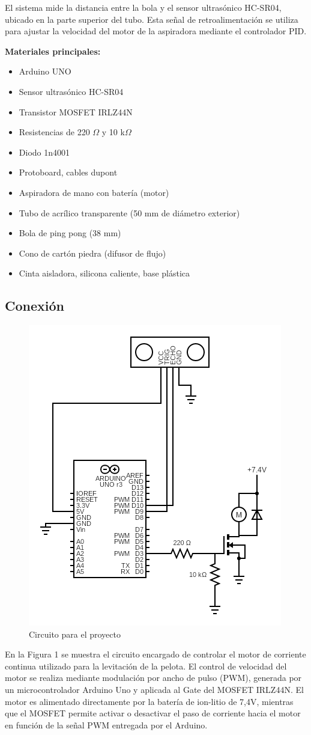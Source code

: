 \documentclass[12pt]{article}
\begin{document}
El sistema mide la distancia entre la bola y el sensor ultrasónico HC-SR04, ubicado en la parte superior del tubo. Esta señal de retroalimentación se utiliza para ajustar la velocidad del motor de la aspiradora mediante el controlador PID.

\textbf{Materiales principales:}
\begin{itemize}
\item Arduino UNO
\item Sensor ultrasónico HC-SR04
\item Transistor MOSFET IRLZ44N
\item Resistencias de 220 $\Omega$ y 10 k$\Omega$
\item Diodo 1n4001
\item Protoboard, cables dupont
\item Aspiradora de mano con batería (motor)
\item Tubo de acrílico transparente (50 mm de diámetro exterior)
\item Bola de ping pong (38 mm)
\item Cono de cartón piedra (difusor de flujo)
\item Cinta aisladora, silicona caliente, base plástica
\end{itemize}

\subsection{Conexión}

\begin{figure}[h!]
    \centering
    \includegraphics[width=0.5\linewidth]{imagenes/circuit (1).png}
    \caption{Circuito para el proyecto}
\end{figure}

En la Figura 1 se muestra el circuito encargado de controlar el motor de corriente continua utilizado para la levitación de la pelota. El control de velocidad del motor se realiza mediante modulación por ancho de pulso (PWM), generada por un microcontrolador Arduino Uno y aplicada al Gate del MOSFET IRLZ44N. El motor es alimentado directamente por la batería de ion-litio de 7,4V, mientras que el MOSFET permite activar o desactivar el paso de corriente hacia el motor en función de la señal PWM entregada por el Arduino.
\end{document}
